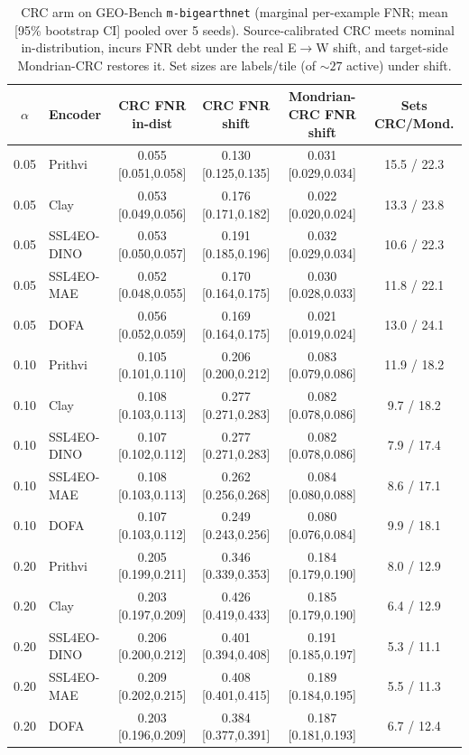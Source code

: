 \documentclass[journal]{IEEEtran}
\renewcommand{\_}{\textunderscore\allowbreak}
\begin{document}
\begin{table}[!t]\centering\small
\caption{CRC arm on GEO-Bench \texttt{m-bigearthnet} (marginal per-example FNR; mean [95\% bootstrap CI]
pooled over 5 seeds). Source-calibrated CRC meets nominal in-distribution, incurs FNR debt under the real
E$\to$W shift, and target-side Mondrian-CRC restores it. Set sizes are labels/tile (of ${\sim}27$ active)
under shift.}\label{tab:crc}
\begin{tabular}{clcccc}
\toprule
$\alpha$ & Encoder & CRC FNR in-dist & CRC FNR shift & Mondrian-CRC FNR shift & Sets CRC/Mond. \\
\midrule
0.05 & Prithvi & 0.055 [0.051,0.058] & 0.130 [0.125,0.135] & 0.031 [0.029,0.034] & 15.5 / 22.3 \\
0.05 & Clay & 0.053 [0.049,0.056] & 0.176 [0.171,0.182] & 0.022 [0.020,0.024] & 13.3 / 23.8 \\
0.05 & SSL4EO-DINO & 0.053 [0.050,0.057] & 0.191 [0.185,0.196] & 0.032 [0.029,0.034] & 10.6 / 22.3 \\
0.05 & SSL4EO-MAE & 0.052 [0.048,0.055] & 0.170 [0.164,0.175] & 0.030 [0.028,0.033] & 11.8 / 22.1 \\
0.05 & DOFA & 0.056 [0.052,0.059] & 0.169 [0.164,0.175] & 0.021 [0.019,0.024] & 13.0 / 24.1 \\
\midrule
0.10 & Prithvi & 0.105 [0.101,0.110] & 0.206 [0.200,0.212] & 0.083 [0.079,0.086] & 11.9 / 18.2 \\
0.10 & Clay & 0.108 [0.103,0.113] & 0.277 [0.271,0.283] & 0.082 [0.078,0.086] & 9.7 / 18.2 \\
0.10 & SSL4EO-DINO & 0.107 [0.102,0.112] & 0.277 [0.271,0.283] & 0.082 [0.078,0.086] & 7.9 / 17.4 \\
0.10 & SSL4EO-MAE & 0.108 [0.103,0.113] & 0.262 [0.256,0.268] & 0.084 [0.080,0.088] & 8.6 / 17.1 \\
0.10 & DOFA & 0.107 [0.103,0.112] & 0.249 [0.243,0.256] & 0.080 [0.076,0.084] & 9.9 / 18.1 \\
\midrule
0.20 & Prithvi & 0.205 [0.199,0.211] & 0.346 [0.339,0.353] & 0.184 [0.179,0.190] & 8.0 / 12.9 \\
0.20 & Clay & 0.203 [0.197,0.209] & 0.426 [0.419,0.433] & 0.185 [0.179,0.190] & 6.4 / 12.9 \\
0.20 & SSL4EO-DINO & 0.206 [0.200,0.212] & 0.401 [0.394,0.408] & 0.191 [0.185,0.197] & 5.3 / 11.1 \\
0.20 & SSL4EO-MAE & 0.209 [0.202,0.215] & 0.408 [0.401,0.415] & 0.189 [0.184,0.195] & 5.5 / 11.3 \\
0.20 & DOFA & 0.203 [0.196,0.209] & 0.384 [0.377,0.391] & 0.187 [0.181,0.193] & 6.7 / 12.4 \\
\bottomrule
\end{tabular}
\end{table}
\end{document}
